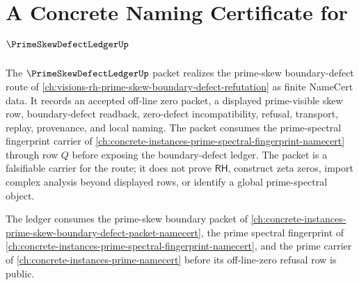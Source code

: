 \chapter{A Concrete Naming Certificate for $\PrimeSkewDefectLedgerUp$}
\label{ch:concrete-instances-prime-skew-defect-ledger-namecert}

The $\PrimeSkewDefectLedgerUp$ packet realizes the prime-skew boundary-defect route of \autoref{ch:visions-rh-prime-skew-boundary-defect-refutation} as finite NameCert data. It records an accepted off-line zero packet, a displayed prime-visible skew row, boundary-defect readback, zero-defect incompatibility, refusal, transport, replay, provenance, and local naming. The packet consumes the prime-spectral fingerprint carrier of \autoref{ch:concrete-instances-prime-spectral-fingerprint-namecert} through row $Q$ before exposing the boundary-defect ledger. The packet is a falsifiable carrier for the route; it does not prove $\mathsf{RH}$, construct zeta zeros, import complex analysis beyond displayed rows, or identify a global prime-spectral object.

The ledger consumes the prime-skew boundary packet of \autoref{ch:concrete-instances-prime-skew-boundary-defect-packet-namecert}, the prime spectral fingerprint of \autoref{ch:concrete-instances-prime-spectral-fingerprint-namecert}, and the prime carrier of \autoref{ch:concrete-instances-prime-namecert} before its off-line-zero refusal row is public.

